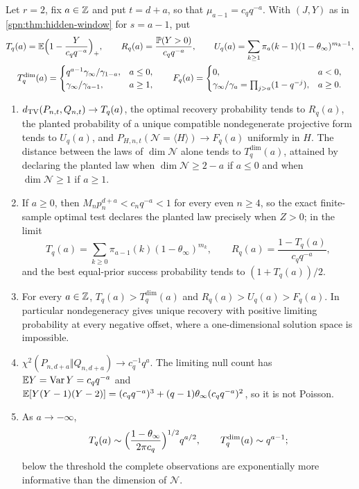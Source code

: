 \begin{corollary}\label{spn:cor:hidden-curves}
Let $r=2$, fix $a\in\mathbb{Z}$ and put $t=d+a$, so that $\mu_{a-1}=c_qq^{-a}$. With $(J,Y)$ as in
\cref{spn:thm:hidden-window} for $s=a-1$, put
\begin{gather*}
 T_q(a)=\mathbb{E}\Bigl(1-\frac{Y}{c_qq^{-a}}\Bigr)_+,\qquad R_q(a)=\frac{\mathbb{P}(Y>0)}{c_qq^{-a}},\qquad
 U_q(a)=\sum_{k\ge1}\pi_a(k-1)(1-\theta_\infty)^{m_k-1},\\
 T^{\dim}_q(a)=\begin{cases}q^{a-1}\gamma_\infty/\gamma_{1-a},&a\le0,\\ \gamma_\infty/\gamma_{a-1},&a\ge1,\end{cases}\qquad
 F_q(a)=\begin{cases}0,&a<0,\\ \gamma_\infty/\gamma_a=\prod_{j>a}(1-q^{-j}),&a\ge0.\end{cases}
\end{gather*}
\begin{enumerate}
\item $d_{\mathrm{TV}}(P_{n,t},Q_{n,t})\to T_q(a)$, the optimal recovery probability tends to $R_q(a)$, the
planted probability of a unique compatible nondegenerate projective form tends to $U_q(a)$, and
$P_{H,n,t}(\mathcal N=\langle H\rangle)\to F_q(a)$ uniformly in $H$. The distance between the laws
of $\dim\mathcal N$ alone tends to $T^{\dim}_q(a)$, attained by declaring the planted law when
$\dim\mathcal N\ge2-a$ if $a\le0$ and when $\dim\mathcal N\ge1$ if $a\ge1$.
\item If $a\ge0$, then $M_np_n^{d+a}<c_nq^{-a}<1$ for every even $n\ge4$, so the exact
finite-sample optimal test declares the planted law precisely when $Z>0$; in the limit
\[
 T_q(a)=\sum_{k\ge0}\pi_{a-1}(k)(1-\theta_\infty)^{m_k},\qquad R_q(a)=\frac{1-T_q(a)}{c_qq^{-a}},
\]
and the best equal-prior success probability tends to $(1+T_q(a))/2$.
\item For every $a\in\mathbb{Z}$, $T_q(a)>T^{\dim}_q(a)$ and $R_q(a)>U_q(a)>F_q(a)$. In particular
nondegeneracy gives unique recovery with positive limiting probability at every negative offset,
where a one-dimensional solution space is impossible.
\item $\chi^2(P_{n,d+a}\Vert Q_{n,d+a})\to c_q^{-1}q^a$. The limiting null count has
$\mathbb{E} Y=\operatorname{Var}Y=c_qq^{-a}$ and
$\mathbb{E}[Y(Y-1)(Y-2)]=(c_qq^{-a})^3+(q-1)\theta_\infty(c_qq^{-a})^2$, so it is not Poisson.
\item As $a\to-\infty$,
\[
 T_q(a)\sim\Bigl(\frac{1-\theta_\infty}{2\pi c_q}\Bigr)^{1/2}q^{a/2},\qquad T^{\dim}_q(a)\sim q^{a-1};
\]
below the threshold the complete observations are exponentially more informative than the dimension
of $\mathcal N$.
\end{enumerate}
\end{corollary}

